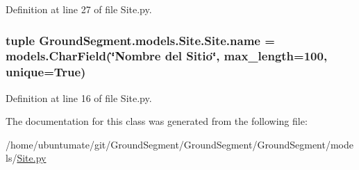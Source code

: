 Definition at line 27 of file Site.\+py.

\hypertarget{class_ground_segment_1_1models_1_1_site_1_1_site_abeb61592ac7e77f994fc0199295aafe2}{}
\subsubsection[{name}]{\setlength{\rightskip}{0pt plus 5cm}tuple Ground\+Segment.\+models.\+Site.\+Site.\+name = models.\+Char\+Field(\char`\"{}Nombre del Sitio\char`\"{}, max\+\_\+length=100, unique=True)\hspace{0.3cm}{\ttfamily [static]}}\label{class_ground_segment_1_1models_1_1_site_1_1_site_abeb61592ac7e77f994fc0199295aafe2}


Definition at line 16 of file Site.\+py.



The documentation for this class was generated from the following file\+:\begin{DoxyCompactItemize}
\item 
/home/ubuntumate/git/\+Ground\+Segment/\+Ground\+Segment/\+Ground\+Segment/models/\hyperlink{_site_8py}{Site.\+py}\end{DoxyCompactItemize}
